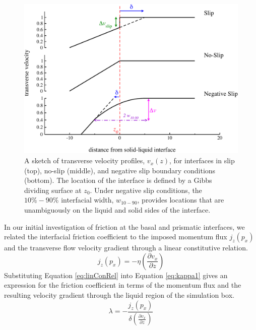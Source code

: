 \begin{figure}
\includegraphics[width=\linewidth]{Figures/slipLengthPlot}
\caption{\label{fig:slipLength} A sketch of transverse velocity
  profiles, $v_x(z)$, for interfaces in slip (top), no-slip (middle),
  and negative slip boundary conditions (bottom).  The location of the
  interface is defined by a Gibbs dividing surface at $z_0$. Under
  negative slip conditions, the $10\%-90\%$ interfacial width,
  $w_{10-90}$, provides locations that are unambiguously on the liquid
  and solid sides of the interface.\label{fig:slipLengthPlot}}
\end{figure}


In our initial investigation of friction at the basal and prismatic
interfaces,\cite{Louden2013a} we related the interfacial friction
coefficient to the imposed momentum flux $j_z(p_x)$ and the transverse
flow velocity gradient through a linear constitutive relation.
\begin{equation}\label{eq:linConRel}
j_{z}(p_{x})=-\eta \left(\frac{\partial v_{x}}{\partial z}\right)
\end{equation}
Substituting Equation \eqref{eq:linConRel} into Equation \eqref{eq:kappa1} gives
an expression for the friction coefficient in terms of the momentum
flux and the resulting velocity gradient through the liquid region of
the simulation box.
\begin{equation}\label{eq:lambda}
\lambda=-\frac{j_{z}(p_{x})} {\delta\left(\frac{\partial v_{x}}{\partial
      z}\right) }
\end{equation}


